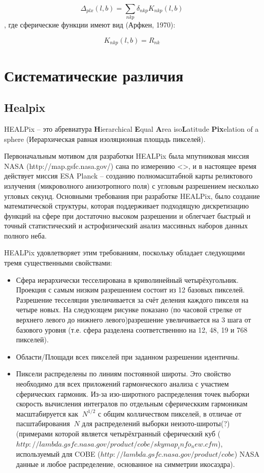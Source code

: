 \documentclass[14pt]{article} %
\begin{document}
$$ \Delta_{plx} (l,b) = \sum_{nkp}\delta_{nkp}K_{nkp}(l,b) $$,
где сферические функции имеют вид (Арфкен, 1970):

$$ K_{nkp}(l,b) = R_{nk} $$


\section{Систематические различия}\label{sistem}
		

\subsection{Healpix}\label{sub:smthhealpix}
HEALPix -- это абревиатура \textbf{H}ierarchical \textbf{E}qual \textbf{A}rea iso\textbf{L}atitude \textbf{Pix}elation of a sphere (Иерархическая равная изоляционная площадь пикселей). 

Первоначальным мотивом для разработки HEALPix была мпутниковая миссия NASA (http://map.gsfc.nasa.gov/) сана по измерению <>, и в настоящее время действует миссия ESA Planck -- созданию полномасштабной карты реликтового излучения (микроволного анизотропного поля) с угловым разрешением несколько угловых секунд. Основными требования при разработке HEALPix, было создание математической структуры, которая поддерживает подходящую дискретизацию функций на сфере при достаточно высоком разрешении и облегчает быстрый и точный статистический и астрофизический анализ массивных наборов данных полного неба.

HEALPix удовлетворяет этим требованиям, поскольку обладает следующими тремя существенными свойствами:

\begin{itemize}
\item Сфера иерархически тесселирована в криволинейный четырёхугольник. Проекция с самым низким разрешением состоит из 12 базовых пикселей. Разрешение тесселяции увеличивается за счёт деления каждого пикселя на четыре новых. На следуюзщем рисунке показано (по часовой стрелке от верхнего левого до нижнего левого)разрешение увеличивается на 3 шага от базового уровня (т.е. сфера разделена соответственнно на 12, 48, 19 и 768 пикселей).
\item Области/Площади всех пикселей при заданном разрешении идентичны.
\item Пиксели распределены по линиям постоянной широты. Это свойство необходимо для всех приложений гармонческого анализа с участием сферических гармоник. Из-за изо-широтного распределения точек выборки скорость вычисления интегралов по отдельным сферическким гармоникам масштабируется как $~N^{1/2}$ с общим колличеством пикселей, в отличае от пасштабирования $~N$ для распределений выборки неизото-широты(?) (примерами которой является четырёхгранный сферический куб ($http://lambda.gsfc.nasa.gov/product/cobe/skymap_info_new.cfm$), используемый для COBE ($http://lambda.gsfc.nasa.gov/product/cobe$) NASA данные и любое распределение, основанное на симметрии икосаэдра).
\end{itemize}
\end{document}
